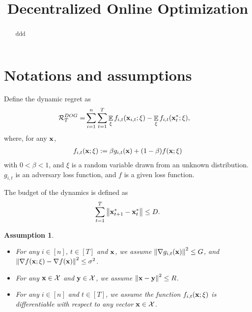 \documentclass{article}
\title{Decentralized Online Optimization}
\newtheorem{Assumption}{\bf{Assumption}}
\begin{document}
\maketitle

\begin{abstract}
ddd
\end{abstract}

\section{Notations and assumptions}





Define the dynamic regret as
\begin{align}
\nonumber
{\mathcal{R}}_T^{DOG} = & \sum_{i=1}^n\sum_{t=1}^T \mathop{\mathbb{E}}_{\xi}f_{i,t}({\bf x}_{i,t};\xi) - \mathop{\mathbb{E}}_{\xi}f_{i,t}({\bf x}_t^\ast;\xi),
\end{align} where, for any ${\bf x}$,
\begin{align}
\nonumber
f_{i,t}({\bf x};\xi) := \beta g_{i,t}({\bf x}) + (1-\beta) f({\bf x}; \xi)
\end{align} with $0<\beta<1$, and $\xi$ is a random variable drawn from an unknown distribution. $g_{i,t}$ is an adversary loss function, and $f$ is a given loss function.



The budget of the dynamics is defined as
\begin{align}
\nonumber
\sum_{t=1}^T \left\lVert{\bf x}_{t+1}^\ast - {\bf x}_t^\ast\right\rVert \le D.
\end{align}



\begin{Assumption}
\label{assumption_bounded_gradient_domain}

\begin{itemize}
\item For any $i\in[n]$, $t\in[T]$ and ${\bf x}$, we assume $\left\lVert\nabla g_{i,t}({\bf x})\right\rVert^2 \le G$, and $\left\lVert\nabla f({\bf x};\xi) - \nabla f({\bf x})\right\rVert^2 \le \sigma^2$.
\item For any ${\bf x}\in{\mathcal{X}}$ and ${\bf y}\in{\mathcal{X}}$, we assume $\left\lVert{\bf x}-{\bf y}\right\rVert^2 \le R$.
\item For any $i\in[n]$ and $t\in[T]$, we assume the function $f_{i,t}({\bf x};\xi)$ is differentiable with respect to any vector ${\bf x}\in{\mathcal{X}}$.
\end{itemize}

 
\end{Assumption}
\end{document}
